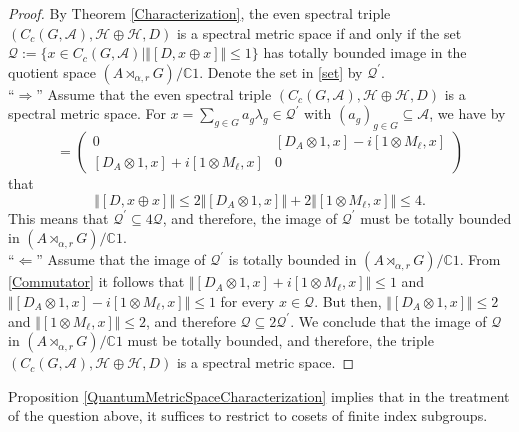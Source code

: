 \documentclass[a4paper,11pt,reqno]{amsart}
\numberwithin{equation}{section}
\numberwithin{equation}{section}
\theoremstyle{definition}
\theoremstyle{remark}
\theoremstyle{remark}
\begin{document}
\begin{proof} By Theorem \ref{Characterization}, the even spectral
triple $(C_{c}(G,\mathcal{A}),\mathcal{H}\oplus\mathcal{H},D)$ is a spectral metric space if and only if the set $\mathcal{Q}:=\{x\in C_{c}(G,\mathcal{A})\mid\Vert[D,x\oplus x]\Vert\leq1\}$
has totally bounded image in the quotient space $(A\rtimes_{\alpha,r}G)/\mathbb{C}1$.
Denote the set in \eqref{set} by $\mathcal{Q}^{\prime}$. \\

``$\Rightarrow$'' Assume that the even spectral triple $(C_{c}(G,\mathcal{A}),\mathcal{H}\oplus\mathcal{H},D)$
is a spectral metric space. For $x=\sum_{g\in G}a_{g}\lambda_{g}\in\mathcal{Q}^{\prime}$
with $(a_{g})_{g\in G}\subseteq\mathcal{A}$, we have by
\begin{equation}
[D,x\oplus x]=\left(\begin{array}{cc}
0 & [D_{A}\otimes1,x]-i[1\otimes M_{\ell},x]\\{}
[D_{A}\otimes1,x]+i[1\otimes M_{\ell},x] & 0
\end{array}\right)\label{Commutator}
\end{equation}
that 
\[
\Vert[D,x\oplus x]\Vert\leq2\Vert[D_{A}\otimes1,x]\Vert+2\Vert[1\otimes M_{\ell},x]\Vert\leq4.
\]
This means that $\mathcal{Q}^{\prime}\subseteq4\mathcal{Q}$, and therefore,
the image of $\mathcal{Q}^{\prime}$ must be totally bounded in $(A\rtimes_{\alpha,r}G)/\mathbb{C}1$. \\

``$\Leftarrow$'' Assume that the image of $\mathcal{Q}^{\prime}$
is totally bounded in $(A\rtimes_{\alpha,r}G)/\mathbb{C}1$. From
\eqref{Commutator} it follows that $\Vert[D_{A}\otimes1,x]+i[1\otimes M_{\ell},x]\Vert\leq1$
and $\Vert[D_{A}\otimes1,x]-i[1\otimes M_{\ell},x]\Vert\leq1$ for
every $x\in\mathcal{Q}$. But then, $\Vert[D_{A}\otimes1,x]\Vert\leq2$
and $\Vert[1\otimes M_{\ell},x]\Vert\leq2$, and therefore $\mathcal{Q}\subseteq2\mathcal{Q}^{\prime}$.
We conclude that the image of $\mathcal{Q}$ in $(A\rtimes_{\alpha,r}G)/\mathbb{C}1$
must be totally bounded, and therefore, the triple $(C_{c}(G,\mathcal{A}),\mathcal{H}\oplus\mathcal{H},D)$
is a spectral metric space. \end{proof}

Proposition \ref{QuantumMetricSpaceCharacterization} implies that
in the treatment of the question above, it suffices to restrict to cosets of finite index subgroups.
\end{document}

